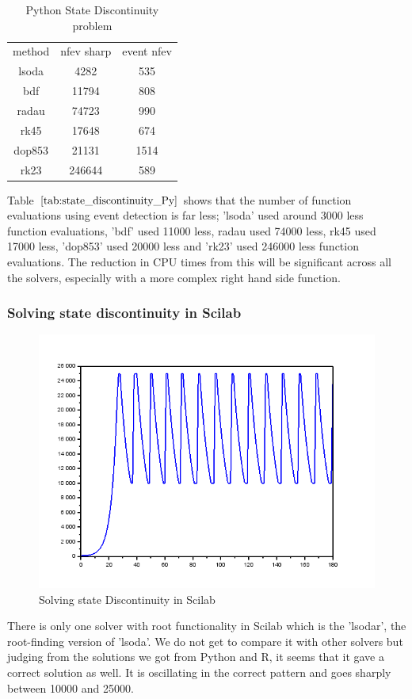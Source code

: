 \begin{table}[h]
\caption {Python State Discontinuity problem} \label{tab:state_discontinuity_Py}
\begin{center}
\begin{tabular}{ c c c } 
method & nfev sharp & event nfev  \\ 
lsoda  & 4282   & 535  \\
bdf    & 11794  & 808  \\
radau  & 74723  & 990  \\
rk45   & 17648  & 674  \\
dop853 & 21131  & 1514 \\
rk23   & 246644 & 589  \\
\end{tabular}
\end{center}
\end{table}

Table $\ref{tab:state_discontinuity_Py}$ shows that the number of function evaluations using event detection is far less; 'lsoda' used around 3000 less function evaluations, 'bdf' used 11000 less, radau used 74000 less, rk45 used 17000 less, 'dop853' used 20000 less and 'rk23' used 246000 less function evaluations. The reduction in CPU times from this will be significant across all the solvers, especially with a more complex right hand side function.

\subsubsection{Solving state discontinuity in Scilab}
\begin{figure}[h]
	\centering
	\includegraphics[width=0.7\linewidth]{./figures/solve_state_discontinuity_scilab}
	\caption{Solving state Discontinuity in Scilab}
	\label{fig:solve_state_discontinuity_scilab}
\end{figure}
There is only one solver with root functionality in Scilab which is the 'lsodar', the root-finding version of 'lsoda'. We do not get to compare it with other solvers but judging from the solutions we got from Python and R, it seems that it gave a correct solution as well. It is oscillating in the correct pattern and goes sharply between 10000 and 25000.

